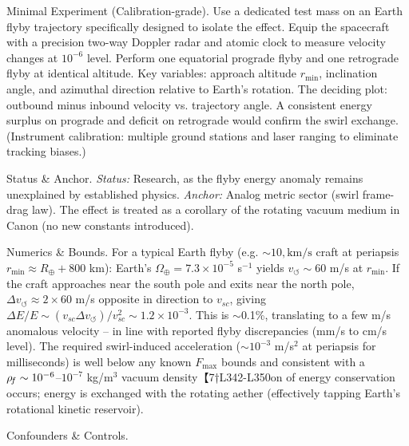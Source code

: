 \documentclass[11pt]{article}
\begin{document}
Minimal Experiment (Calibration-grade). Use a dedicated test mass on an Earth flyby trajectory specifically designed to isolate the effect. Equip the spacecraft with a precision two-way Doppler radar and atomic clock to measure velocity changes at $10^{-6}$ level. Perform one equatorial prograde flyby and one retrograde flyby at identical altitude. Key variables: approach altitude $r_{\min}$, inclination angle, and azimuthal direction relative to Earth’s rotation. The deciding plot: outbound minus inbound velocity vs. trajectory angle. A consistent energy surplus on prograde and deficit on retrograde would confirm the swirl exchange. (Instrument calibration: multiple ground stations and laser ranging to eliminate tracking biases.)


Status & Anchor. \textit{Status:} Research, as the flyby energy anomaly remains unexplained by established physics. \textit{Anchor:} Analog metric sector (swirl frame-drag law). The effect is treated as a corollary of the rotating vacuum medium in Canon (no new constants introduced).


Numerics & Bounds. For a typical Earth flyby (e.g. $\sim 10,\text{km/s}$ craft at periapsis $r_{\min}\approx R_{\oplus}+800$ km): Earth’s $\Omega_{\oplus}=7.3\times10^{-5}$ s$^{-1}$ yields $v_{\circlearrowleft}\sim 60$ m/s at $r_{\min}$. If the craft approaches near the south pole and exits near the north pole, $\Delta v_{\circlearrowleft}\approx 2 \times 60$ m/s opposite in direction to $v_{sc}$, giving $\Delta E/E \sim (v_{sc}\Delta v_{\circlearrowleft})/v_{sc}^2 \sim 1.2\times10^{-3}$. This is $\sim$0.1\%, translating to a few m/s anomalous velocity – in line with reported flyby discrepancies (mm/s to cm/s level). The required swirl-induced acceleration ($\sim 10^{-3}$ m/s$^2$ at periapsis for milliseconds) is well below any known $F_{\max}$ bounds and consistent with a $\rho_{\!f} \sim 10^{-6}$–$10^{-7}$ kg/m$^3$ vacuum density【7†L342-L350on of energy conservation occurs; energy is exchanged with the rotating aether (effectively tapping Earth’s rotational kinetic reservoir).


Confounders & Controls.
\end{document}
